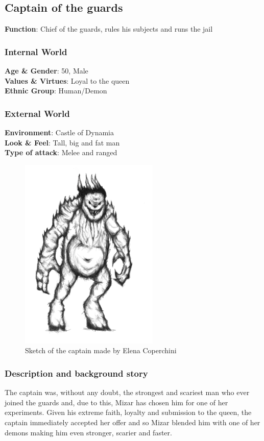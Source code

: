 \subsection{Captain of the guards}

\begin{minipage}{0.5\textwidth}
\textbf{Function}: Chief of the guards, rules his subjects and runs the jail

\subsubsection{Internal World}

\textbf{Age \& Gender}: 50, Male \\
\textbf{Values \& Virtues}: Loyal to the queen\\
\textbf{Ethnic Group}: Human/Demon

\subsubsection{External World}
\textbf{Environment}: Castle of Dynamia \\
\textbf{Look \& Feel}: Tall, big and fat man\\
\textbf{Type of attack}: Melee and ranged \\
\end{minipage}%
%
\hfill\begin{minipage}{0.4\textwidth}
  \begin{figure}[H]
  \includegraphics{Images/Enemies/captain_portrait}
   \caption{Sketch of the captain made by Elena Coperchini}
  \end{figure}
\end{minipage}


\subsubsection{Description and background story}
The captain was, without any doubt, the strongest and scariest man who ever joined the guards and, due to this, Mizar has chosen him for one of her experiments. Given his extreme faith, loyalty and submission to the queen, the captain immediately accepted her offer and so Mizar blended him with one of her demons making him even stronger, scarier and faster.

